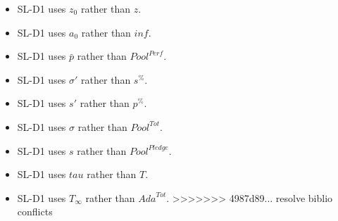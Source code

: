 \documentclass[11pt,a4paper,dvipsnames,twosided,final]{article}
\begin{document}
\begin{itemize}
\item
  SL-D1 uses $z_0$ rather than $z$.
\item
  SL-D1 uses $a_0$ rather than $\textit{inf}$.
\item
  SL-D1 uses $\bar{p}$  rather than $\textit{Pool}^{\textit{Perf}}$.
\item
  SL-D1 uses $\sigma'$  rather than $\textit{s}^{\%}$.
\item
  SL-D1 uses $s'$  rather than $\textit{p}^{\%}$.
\item
  SL-D1 uses $\sigma$  rather than $\textit{Pool}^{\textit{Tot}}$.
\item
  SL-D1 uses $s$  rather than $\textit{Pool}^{\textit{Pledge}}$.
\item
  SL-D1 uses $tau$  rather than $T$.
\item
  SL-D1 uses $T_{\infty}$  rather than $\textit{Ada}^{Tot}$.
>>>>>>> 4987d89... resolve biblio conflicts
\end{itemize}
\end{document}
